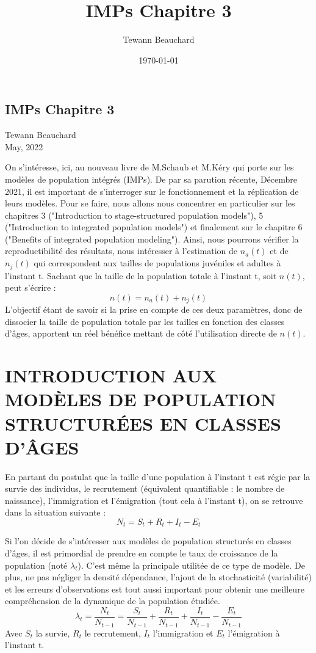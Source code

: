 \documentclass[12pt,a4paper]{article}
\title{IMPs Chapitre 3}
\date{\today}
\author{Tewann Beauchard}
\begin{document}
\begin{center}
\section*{IMPs Chapitre 3}
\vspace*{1cm}
Tewann Beauchard \\
\vspace*{1cm}
May, 2022
\end{center}
\vspace*{1cm}

On s'intéresse, ici, au nouveau livre de M.Schaub et M.Kéry qui porte sur les modèles de population intégrés (IMPs). De par sa parution récente, Décembre 2021, il est important de s'interroger sur le fonctionnement et la réplication de leurs modèles. Pour se faire, nous allons nous concentrer en particulier sur les chapitres 3 ("Introduction to stage-structured population models"), 5 ("Introduction to integrated population models") et finalement sur le chapitre 6 ("Benefits of integrated population modeling"). Ainsi, nous pourrons vérifier la reproductibilité des résultats, nous intéresser à l'estimation de $n_{a}(t)$ et de $n_{j}(t)$ qui correspondent aux tailles de populations juvéniles et adultes à l'instant t. Sachant que la taille de la population totale à l'instant t, soit $n(t)$, peut s'écrire : $$n(t)= n_{a}(t) + n_{j}(t)$$L'objectif étant de savoir si la prise en compte de ces deux paramètres, donc de dissocier la taille de population totale par les tailles en fonction des classes d'âges, apportent un réel bénéfice mettant de côté l'utilisation directe de $n(t)$.

\section{INTRODUCTION AUX MODÈLES DE POPULATION STRUCTURÉES EN CLASSES D'ÂGES}
En partant du postulat que la taille d'une population à l'instant t est régie par la survie des individus, le recrutement (équivalent quantifiable : le nombre de naissance), l'immigration et l'émigration (tout cela à l'instant t), on se retrouve dans la situation suivante : 
\begin{equation}
N_{t}=S_{t}+R_{t}+I_{t}-E_{t}
\end{equation}

Si l'on décide de s'intéresser aux modèles de population structurés en classes d'âges, il est primordial de prendre en compte le taux de croissance de la population (noté $\lambda_{t}$). C'est même la principale utilitée de ce type de modèle. De plus, ne pas négliger la densité dépendance, l'ajout de la stochasticité (variabilité) et les erreurs d'observations est tout aussi important pour obtenir une meilleure compréhension de la dynamique de la population étudiée.
\begin{equation}
\lambda_{t}=\dfrac{N_{t}}{N_{t-1}}=\dfrac{S_{t}}{N_{t-1}}+\dfrac{R_{t}}{N_{t-1}}+\dfrac{I_{t}}{N_{t-1}}-\dfrac{E_{t}}{N_{t-1}}
\end{equation}
Avec $S_{t}$ la survie, $R_{t}$ le recrutement, $I_{t}$ l'immigration et $E_{t}$ l'émigration à l'instant t.
\end{document}
